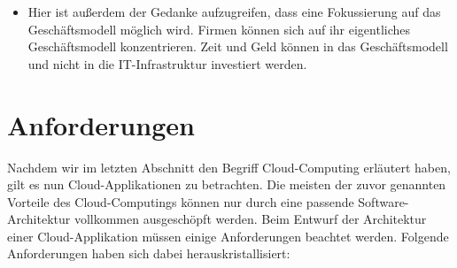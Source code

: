 \begin{itemize}
  \item Hier ist außerdem der Gedanke aufzugreifen, dass eine Fokussierung auf das Geschäftsmodell möglich wird. Firmen können sich auf ihr eigentliches Geschäftsmodell konzentrieren. Zeit und Geld können in das Geschäftsmodell und nicht in die IT-Infrastruktur investiert werden.
\end{itemize}

\section{Anforderungen}
Nachdem wir im letzten Abschnitt den Begriff Cloud-Computing erläutert haben, gilt es nun Cloud-Applikationen zu betrachten. Die meisten der zuvor genannten Vorteile des Cloud-Computings können nur durch eine passende Software-Architektur vollkommen ausgeschöpft werden. Beim Entwurf der Architektur einer Cloud-Applikation müssen einige Anforderungen beachtet werden. Folgende Anforderungen haben sich dabei herauskristallisiert:
